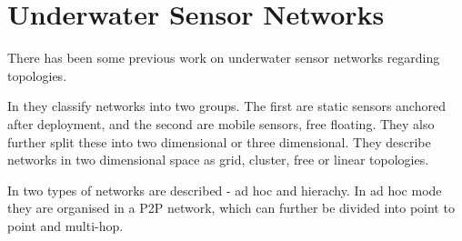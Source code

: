 \section{Underwater Sensor Networks}
There has been some previous work on underwater sensor networks regarding
topologies.

In \cite{a_review_on_underwater_wireless_sensor_networks} they classify networks
into two groups. The first are static sensors anchored after deployment, and the
second are mobile sensors, free floating. They also further split these into
two dimensional or three dimensional. They describe networks in two
dimensional space as grid, cluster, free or linear topologies.

In \cite{uwsn_applications_challenges_design_issues} two types of networks are
described - ad hoc and hierachy. In ad hoc mode they are organised in a
\ac{P2P} network, which can further be divided into point to point and
multi-hop.